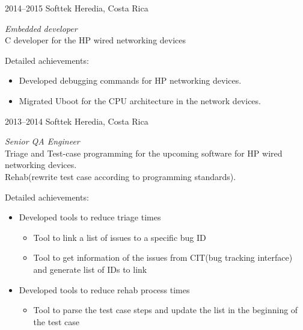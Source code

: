 \documentclass[]{friggeri-cv}
\begin{document}
\begin{entrylist}
\entry
{2014--2015}
{Softtek}
{Heredia, Costa Rica}
{\emph{Embedded developer} \\
C developer for the HP wired networking devices

Detailed achievements:
\begin{itemize}
\item Developed debugging commands for HP networking devices.
\item Migrated Uboot for the CPU architecture in the network devices.
\end{itemize}
}

\entry
{2013--2014}
{Softtek}
{Heredia, Costa Rica}
{\emph{Senior QA Engineer} \\
Triage and Test-case programming for the upcoming software for HP wired networking devices.\\
Rehab(rewrite test case according to programming standards).

Detailed achievements:
\begin{itemize}
\item Developed tools to reduce triage times
\begin{itemize}
\item Tool to link a list of issues to a specific bug ID
\item Tool to get information of the issues from CIT(bug tracking interface) and generate list of IDs to link
\end{itemize}
\item Developed tools to reduce rehab process times
\begin{itemize}
\item Tool to parse the test case steps and update the list in the beginning of the test case 
\end{itemize}
\end{itemize}
}
\end{entrylist}
\end{document}
